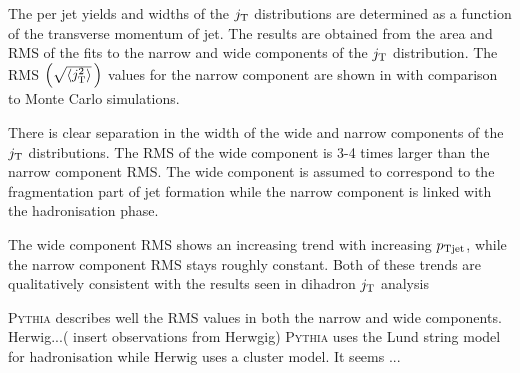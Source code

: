 
The per jet yields and widths of the $j_{\rm T}$ distributions are determined as a function of the transverse momentum of jet. The results are obtained from the area and RMS of the fits to the narrow and wide components of the $j_{\rm T}$ distribution. The RMS $\left(\sqrt{\left<j_{\rm T}^2\right>}\,\right)$ values for the narrow component are shown in  with comparison to Monte Carlo simulations. 

There is clear separation in the width of the wide and narrow components of the $j_{\rm T}$ distributions. The RMS of the wide component is 3-4 times larger than the narrow component RMS. The wide component is assumed to correspond to the fragmentation part of jet formation while the narrow component is linked with the hadronisation phase.

The wide component RMS shows an increasing trend with increasing $p_{\rm Tjet}$, while the narrow component RMS stays roughly constant. Both of these trends are qualitatively consistent with the results seen in dihadron $j_{\rm T}$ analysis~\cite{ALICEjt}

\textsc{Pythia} describes well the RMS values in both the narrow and wide components. Herwig...({\color{red} insert observations from Herwgig}) \textsc{Pythia} uses the Lund string model for hadronisation while Herwig uses a cluster model. It seems ... 


